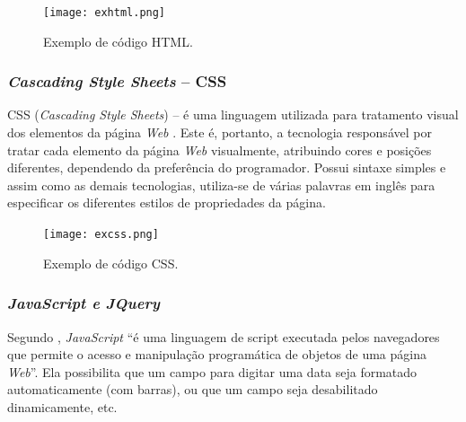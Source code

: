 \begin{figure} [hbt] 
\begin{center}
\texttt{[image: exhtml.png]} %
\end{center}
\label{figura1} 
\caption{Exemplo de código HTML.}
\end{figure}

\subsubsection{\textit{Cascading Style Sheets} – CSS}

CSS (\textit{Cascading Style Sheets}) – é uma linguagem utilizada para tratamento
visual dos elementos da página \textit{Web} \cite{folle}. Este é, portanto, a tecnologia
responsável por tratar cada elemento da página \textit{Web} visualmente, atribuindo cores e
posições diferentes, dependendo da preferência do programador. Possui sintaxe
simples e assim como as demais tecnologias, utiliza-se de várias palavras em inglês
para especificar os diferentes estilos de propriedades da página.

\begin{figure} [hbt] 
\begin{center}
\texttt{[image: excss.png]}
\end{center}
\label{figura1} 
\caption{Exemplo de código CSS.}
\end{figure}

\subsubsection{\textit{JavaScript e JQuery}}

Segundo , \textit{JavaScript} “é uma linguagem de script executada pelos
navegadores que permite o acesso e manipulação programática de objetos de uma
página \textit{Web}”. Ela possibilita que um campo para digitar uma data seja formatado
automaticamente (com barras), ou que um campo seja desabilitado dinamicamente,
etc. 

